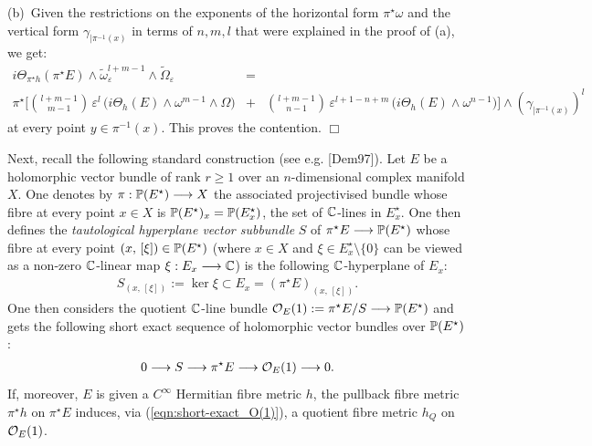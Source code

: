 \documentclass[12pt]{article}
\begin{document}
    (b)\, Given the restrictions on the exponents of the horizontal form $\pi^\star\omega$ and the vertical form $\gamma_{|\pi^{-1}(x)}$ in terms of $n, m, l$ that were explained in the proof of (a), we get: \begin{eqnarray*} i\Theta_{\pi^\star h}(\pi^\star E)\wedge\widetilde\omega_\varepsilon^{l+m-1}\wedge\widetilde\Omega_\varepsilon & = & \\
 \pi^\star\bigg[{l+m-1 \choose m-1}\,\varepsilon^l\,\bigg(i\Theta_h(E)\wedge\omega^{m-1}\wedge\Omega\bigg) & + & {l+m-1 \choose n-1}\,\varepsilon^{l+1-n+m}\,\bigg(i\Theta_h(E)\wedge\omega^{n-1}\bigg)\bigg]\wedge(\gamma_{|\pi^{-1}(x)})^l\end{eqnarray*} at every point $y\in\pi^{-1}(x)$. This proves the contention. \hfill $\Box$





\vspace{2ex}

Next, recall the following standard construction (see e.g. [Dem97]). Let $E$ be a holomorphic vector bundle of rank $r\geq 1$ over an $n$-dimensional complex manifold $X$. One denotes by $\pi:\mathbb{P}(E^\star)\longrightarrow X$ the associated projectivised bundle whose fibre at every point $x\in X$ is $\mathbb{P}(E^\star)_x = \mathbb{P}(E^\star_x)$, the set of $\mathbb{C}$-lines in $E^\star_x$. One then defines the {\it tautological hyperplane vector subbundle} $S$ of $\pi^\star E\longrightarrow\mathbb{P}(E^\star)$ whose fibre at every point $(x,\,[\xi])\in\mathbb{P}(E^\star)$ (where $x\in X$ and $\xi\in E^\star_x\setminus\{0\}$ can be viewed as a non-zero $\mathbb{C}$-linear map $\xi:E_x\longrightarrow\mathbb{C}$) is the following $\mathbb{C}$-hyperplane of $E_x$: \begin{eqnarray*}S_{(x,\,[\xi])}:=\ker\xi\subset E_x = (\pi^\star E)_{(x,\,[\xi])}.\end{eqnarray*} One then considers the quotient $\mathbb{C}$-line bundle ${\cal O}_E(1):=\pi^\star E/S\longrightarrow\mathbb{P}(E^\star)$ and gets the following short exact sequence of holomorphic vector bundles over $\mathbb{P}(E^\star)$: \begin{eqnarray}\label{eqn:short-exact_O(1)}0\longrightarrow S\longrightarrow\pi^\star E\longrightarrow{\cal O}_E(1)\longrightarrow 0.\end{eqnarray} If, moreover, $E$ is given a $C^\infty$ Hermitian fibre metric $h$, the pullback fibre metric $\pi^\star h$ on $\pi^\star E$ induces, via (\ref{eqn:short-exact_O(1)}), a quotient fibre metric $h_Q$ on ${\cal O}_E(1)$.
\end{document}
